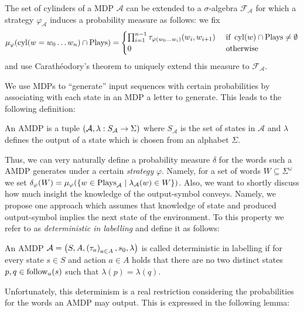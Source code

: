 The set of cylinders of a \ac{MDP} $\mathcal{A}$ can be extended to a
$\sigma$-algebra $\mathcal{F}_{\mathcal{A}}$ for which a strategy
$\varphi_{\mathcal{A}}$ induces a probability measure as follows: we fix
\begin{equation}
  \mu_{\varphi}(\operatorname{cyl}(w = w_{0}\dots w_{n})\cap\operatorname{Plays}) = \begin{cases}
    \prod_{i=1}^{n-1}\tau_{\varphi(w_{0}\dots w_{i})}(w_{i}, w_{i+1}) &\text{ if }\operatorname{cyl}(w)\cap\operatorname{Plays}\neq\emptyset\\
    0 &\text{ otherwise}
  \end{cases}
\end{equation}
and use Carath\'eodory's theorem to uniquely extend this measure to
$\mathcal{F}_{\mathcal{A}}$.

We use \acp{MDP} to \enquote{generate} input sequences with certain
probabilities by associating with each state in an \ac{MDP} a letter to
generate. This leads to the following definition:
\begin{definition}
 An \acl{AMDP} is a tuple
 $\left(\mathcal{A}, \lambda: S_{\mathcal{A}}\rightarrow \Sigma\right)$
 where $S_{\mathcal{A}}$ is the set of states in $\mathcal{A}$ and $\lambda$
 defines the output of a state which is chosen from an alphabet $\Sigma$.
\end{definition}
Thus, we can very naturally define a probability measure $\delta$ for the words
such a \ac{AMDP} generates under a certain \emph{strategy} $\varphi$. Namely,
for a set of words $W\subseteq \Sigma^{\omega}$ we set
$
\delta_{\varphi}(W) =
  \mu_{\varphi}(
    \left\{
      w\in \operatorname{Plays}_{\mathcal{A}}\mid \lambda_{\mathcal{A}}(w)\in W
    \right\}
  )
$.
Also, we want to shortly discuss how much insight the knowledge of the
output-symbol conveys. Namely, we propose one approach which assumes that
knowledge of state and produced output-symbol implies the next state of the
environment. To this property we refer to as \emph{deterministic in labelling}
and define it as follows:
\begin{definition}
  An \ac{AMDP} $\mathcal{A} = \left(S, A, \left(\tau_{a}\right)_{a\in A}, s_{0},
  \lambda\right)$ is called deterministic in labelling if for every state $s\in S$
  and action $a\in A$ holds that there are no two distinct states
  $p, q\in\operatorname{follow}_{a}(s)$ such that $\lambda(p) = \lambda(q)$.
\end{definition}
Unfortunately, this determinism is a real restriction considering the
probabilities for the words an \ac{AMDP} may output. This is expressed in the
following lemma:
\begin{lemma}
\end{lemma}
